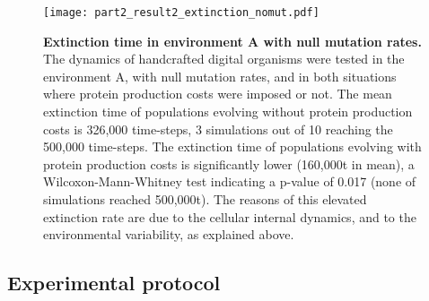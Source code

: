 \begin{figure}[!h]
\centering
\texttt{[image: part2\_result2\_extinction\_nomut.pdf]}
\caption[Extinction time in environment A with null mutation rates.]
{\textbf{Extinction time in environment A with null mutation rates.}
The dynamics of handcrafted digital organisms were tested in the environment A, with null mutation rates, and in both situations where protein production costs were imposed or not. The mean extinction time of populations evolving without protein production costs is 326,000 time-steps, 3 simulations out of 10 reaching the 500,000 time-steps. The extinction time of populations evolving with protein production costs is significantly lower (160,000t in mean), a Wilcoxon-Mann-Whitney test indicating a p-value of 0.017 (none of simulations reached 500,000t). The reasons of this elevated extinction rate are due to the cellular internal dynamics, and to the environmental variability, as explained above.}
\label{fig:part2:second_result:extinction_nomut}
\end{figure}


\subsection{Experimental protocol}
\label{subsec:part2:second_result:experimental_protocol}

